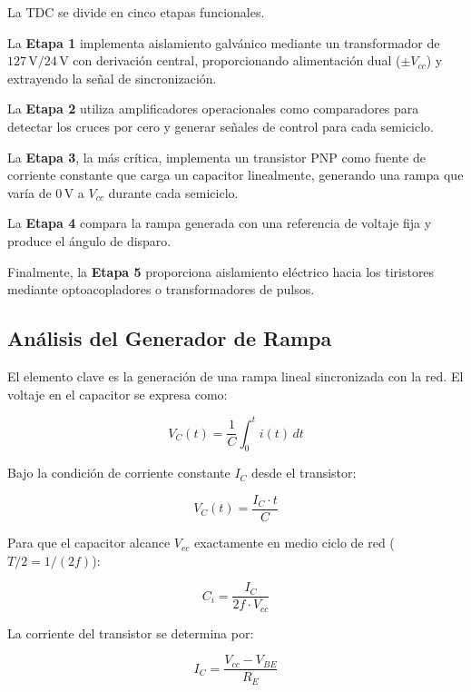 \documentclass[12pt,a4paper]{article}
\begin{document}
La TDC se divide en cinco etapas funcionales.

La \textbf{Etapa 1} implementa aislamiento galvánico mediante un transformador de $127\,\mathrm{V}/24\,\mathrm{V}$ con derivación central, proporcionando alimentación dual ($\pm V_{cc}$) y extrayendo la señal de sincronización.

La \textbf{Etapa 2} utiliza amplificadores operacionales como comparadores para detectar los cruces por cero y generar señales de control para cada semiciclo.

La \textbf{Etapa 3}, la más crítica, implementa un transistor PNP como fuente de corriente constante que carga un capacitor linealmente, generando una rampa que varía de $0\,\mathrm{V}$ a $V_{cc}$ durante cada semiciclo.

La \textbf{Etapa 4} compara la rampa generada con una referencia de voltaje fija y produce el ángulo de disparo.

Finalmente, la \textbf{Etapa 5} proporciona aislamiento eléctrico hacia los tiristores mediante optoacopladores o transformadores de pulsos.
 
\subsection{Análisis del Generador de Rampa}
 
El elemento clave es la generación de una rampa lineal sincronizada con la red. El voltaje en el capacitor se expresa como:
 
\begin{equation}
V_C(t) = \frac{1}{C}\int_0^t i(t)\,dt
\end{equation}
 
Bajo la condición de corriente constante $I_C$ desde el transistor:
 
\begin{equation}
V_C(t) = \frac{I_C \cdot t}{C}
\end{equation}
 
Para que el capacitor alcance $V_{cc}$ exactamente en medio ciclo de red ($T/2 = 1/(2f)$):
 
\begin{equation}
C_i = \frac{I_C}{2f \cdot V_{cc}}
\end{equation}
 
La corriente del transistor se determina por:
 
\begin{equation}
I_C = \frac{V_{cc} - V_{BE}}{R_E}
\end{equation}
 
\end{document}
